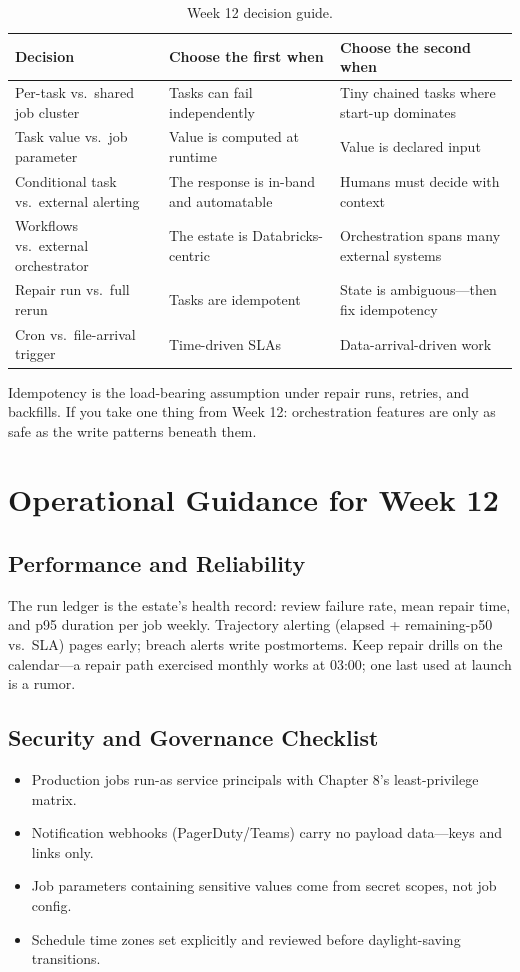 \begin{table}[H]
\centering
\small
\begin{tabular}{@{}p{3.4cm}p{4.4cm}p{4.6cm}@{}}
\toprule
\textbf{Decision} & \textbf{Choose the first when} & \textbf{Choose the second when} \\
\midrule
Per-task vs.\ shared job cluster & Tasks can fail independently & Tiny chained tasks where start-up dominates \\
Task value vs.\ job parameter & Value is computed at runtime & Value is declared input \\
Conditional task vs.\ external alerting & The response is in-band and automatable & Humans must decide with context \\
Workflows vs.\ external orchestrator & The estate is Databricks-centric & Orchestration spans many external systems \\
Repair run vs.\ full rerun & Tasks are idempotent & State is ambiguous---then fix idempotency \\
Cron vs.\ file-arrival trigger & Time-driven SLAs & Data-arrival-driven work \\
\bottomrule
\end{tabular}
\caption{Week 12 decision guide.}
\label{tab:ch12-decisions}
\end{table}

Idempotency is the load-bearing assumption under repair runs, retries, and backfills. If you take one thing from Week 12: orchestration features are only as safe as the write patterns beneath them.

\section{Operational Guidance for Week 12}
%
\subsection{Performance and Reliability}
The run ledger is the estate's health record: review failure rate, mean repair time, and p95 duration per job weekly. Trajectory alerting (elapsed + remaining-p50 vs.\ SLA) pages early; breach alerts write postmortems. Keep repair drills on the calendar---a repair path exercised monthly works at 03:00; one last used at launch is a rumor.

\subsection{Security and Governance Checklist}
\begin{itemize}
    \item Production jobs run-as service principals with Chapter 8's least-privilege matrix.
    \item Notification webhooks (PagerDuty/Teams) carry no payload data---keys and links only.
    \item Job parameters containing sensitive values come from secret scopes, not job config.
    \item Schedule time zones set explicitly and reviewed before daylight-saving transitions.
\end{itemize}

